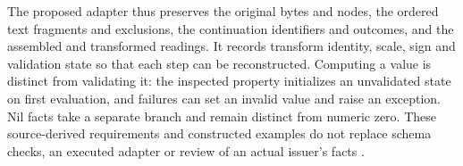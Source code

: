 The proposed adapter thus preserves the original bytes and nodes, the ordered
text fragments and exclusions, the continuation identifiers and outcomes, and
the assembled and transformed readings. It records transform identity, scale,
sign and validation state so that each step can be reconstructed. Computing a
value is distinct from validating it: the inspected property initializes an
unvalidated state on first evaluation, and failures can set an invalid value
and raise an exception. Nil facts take a separate branch and remain distinct
from numeric zero. These source-derived requirements and constructed examples
do not replace schema checks, an executed adapter or review of an actual
issuer's facts \citep{arelleinlinevalues2026}.
